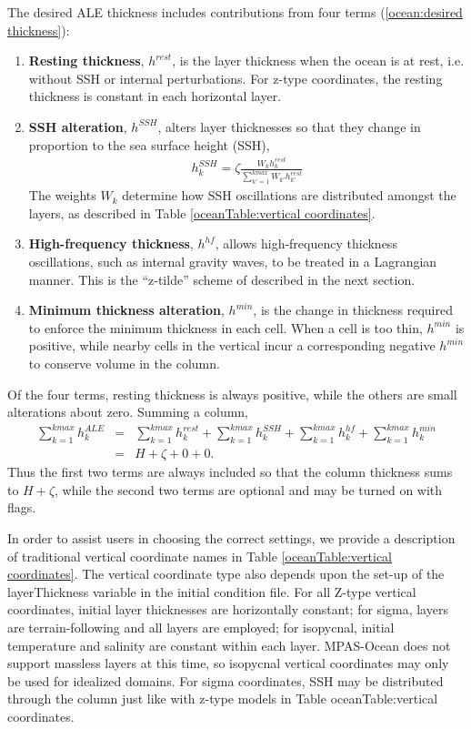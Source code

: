 The desired ALE thickness includes contributions from four terms (\ref{ocean:desired thickness}):
\begin{enumerate}
\item {\bf Resting thickness}, $h^{rest}$, is the layer thickness when the ocean is at rest, i.e. without SSH or internal perturbations.  For z-type coordinates, the resting thickness is constant in each horizontal layer.
\item {\bf SSH alteration}, $h^{SSH}$, alters layer thicknesses so that they change in proportion to the sea surface height (SSH),
\begin{eqnarray}
   h_k^{SSH} =  \zeta \frac{W_k h^{rest}_k}{\sum_{k'=1}^{kmax}W_{k'}h^{rest}_{k'}}
\end{eqnarray}
The weights $W_k$ determine how SSH oscillations are distributed amongst the layers, as described in Table \ref{oceanTable:vertical coordinates}.
\item {\bf High-frequency thickness}, $h^{hf}$, allows high-frequency thickness oscillations, such as internal gravity waves, to be treated in a Lagrangian manner.  This is the ``z-tilde'' scheme of \citet{Leclair_Madec11om} described in the next section.
\item {\bf Minimum thickness alteration}, $h^{min}$, is the change in thickness required to enforce the minimum thickness in each cell.  When a cell is too thin, $h^{min}$ is positive, while nearby cells in the vertical incur a corresponding negative $h^{min}$ to conserve volume in the column.
\end{enumerate}
Of the four terms, resting thickness is always positive, while the others are small alterations about zero.  Summing a column,
\begin{eqnarray}
\sum_{k=1}^{kmax} h_k^{ALE} &=& \sum_{k=1}^{kmax} h_k^{rest} + \sum_{k=1}^{kmax}h_k^{SSH} + \sum_{k=1}^{kmax}h_k^{hf} + \sum_{k=1}^{kmax}h_k^{min} 
\nonumber \\
&=& H + \zeta + 0 + 0.
\nonumber
\end{eqnarray}
Thus the first two terms are always included so that the column thickness sums to $H+\zeta$, while the second two terms are optional and may be turned on with flags.

In order to assist users in choosing the correct settings, we provide a description of traditional vertical coordinate names in Table \ref{oceanTable:vertical coordinates}.
The vertical coordinate type also depends upon the set-up of the layerThickness variable in the initial condition file.  For all Z-type vertical coordinates, initial layer thicknesses are horizontally constant; for sigma, layers are terrain-following and all layers are employed; for isopycnal, initial temperature and salinity are constant within each layer.  MPAS-Ocean does not support massless layers at this time, so isopycnal vertical coordinates may only be used for idealized domains.  For sigma coordinates, SSH may be distributed through the column just like with z-type models in Table {oceanTable:vertical coordinates}.

